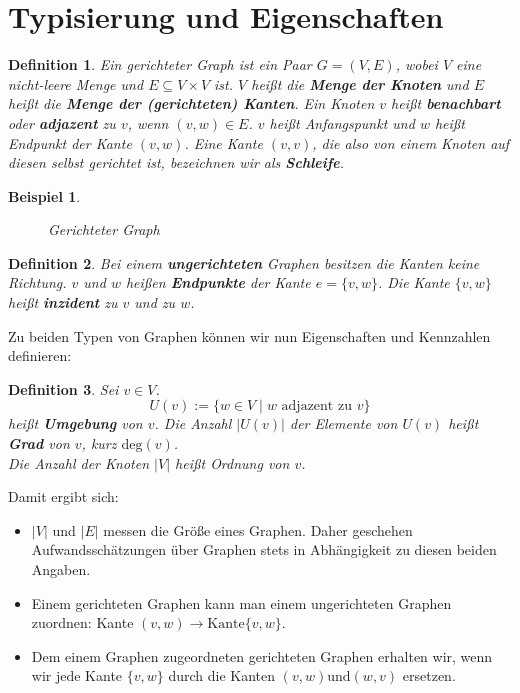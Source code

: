 \documentclass[11pt,a4paper]{scrartcl}
\newtheorem{definition}{Definition}
\newtheorem{example}{Beispiel}
\begin{document}
\section{Typisierung und Eigenschaften}
\begin{definition}
Ein gerichteter Graph ist ein Paar $G = (V, E)$, wobei $V$ eine nicht-leere Menge und $E \subseteq V \times V$ ist. $V$ heißt die \textbf{Menge der Knoten} und $E$ heißt die \textbf{Menge der (gerichteten) Kanten}. Ein Knoten $v$ heißt \textbf{benachbart} oder \textbf{adjazent} zu $v$, wenn $(v, w) \in E$. $v$ heißt Anfangspunkt und $w$ heißt Endpunkt der Kante $(v, w)$. Eine Kante $(v, v)$, die also von einem Knoten auf diesen selbst gerichtet ist, bezeichnen wir als \textbf{Schleife}.
\end{definition}
\begin{example} 
\begin{figure}[h]
\centering
{}
\caption{Gerichteter Graph}
\end{figure}
\end{example}
\begin{definition}
Bei einem \textbf{ungerichteten} Graphen besitzen die Kanten keine Richtung. $v$ und $w$ heißen \textbf{Endpunkte} der Kante $e = \{v, w\}$. Die Kante $\{v, w\}$ heißt \textbf{inzident} zu $v$ und zu $w$. 
\end{definition}
Zu beiden Typen von Graphen können wir nun Eigenschaften und Kennzahlen definieren:
\begin{definition}
Sei $v \in V$. 
\[U(v) := \{w \in V \mid w \text{ adjazent zu } v\}\] heißt \textbf{Umgebung} von $v$. Die Anzahl $\vert U(v) \vert$ der Elemente von $U(v)$ heißt \textbf{Grad} von $v$, kurz $\text{deg}(v)$. \\
Die Anzahl der Knoten $\vert V \vert$ heißt Ordnung von $v$.
\end{definition}
Damit ergibt sich:
\begin{itemize}
\item $\vert V \vert$ und $\vert E \vert$ messen die Größe eines Graphen. Daher geschehen Aufwandsschätzungen über Graphen stets in Abhängigkeit zu diesen beiden Angaben.
\item Einem gerichteten Graphen kann man einem ungerichteten Graphen zuordnen: Kante $(v, w) \to \text{Kante} \{v, w\}$.
\item Dem einem Graphen zugeordneten gerichteten Graphen erhalten wir, wenn wir jede Kante $\{v, w\}$ durch die Kanten $(v, w) \text{und} (w, v)$ ersetzen. 
\end{itemize}
\end{document}
